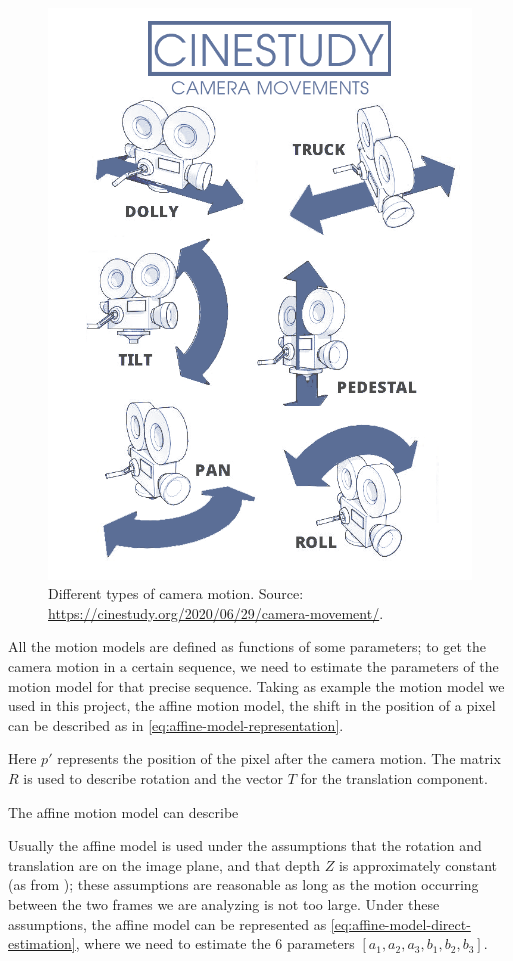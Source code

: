 \begin{figure}
    \centering
    \includegraphics[width=.7\linewidth]{../assets/images/camera-movement.png}
    \caption{Different types of camera motion. Source: \url{https://cinestudy.org/2020/06/29/camera-movement/}.}
    \label{fig:camera-motion}
\end{figure}

All the motion models are defined as functions of some parameters; to get the camera motion in a certain sequence, we need to estimate the parameters of the motion model for that precise sequence. Taking as example the motion model we used in this project, the affine motion model, the shift in the position of a pixel can be described as in \cref{eq:affine-model-representation}.



Here $p'$ represents the position of the pixel after the camera motion. The matrix $R$ is used to describe rotation and the vector $T$ for the translation component.

The affine motion model can describe

Usually the affine model is used under the assumptions that the rotation and translation are on the image plane, and that depth $Z$ is approximately constant (as from \cite{WangBook}); these assumptions are reasonable as long as the motion occurring between the two frames we are analyzing is not too large.
Under these assumptions, the affine model can be represented as \cref{eq:affine-model-direct-estimation}, where we need to estimate the 6 parameters $[a_1, a_2, a_3, b_1, b_2, b_3 ]$.

